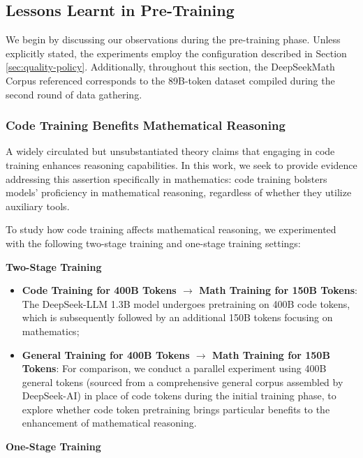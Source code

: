 \begin{itemize}[topsep=0pt]
\begin{itemize}[topsep=0pt]
\subsection{Lessons Learnt in Pre-Training}

We begin by discussing our observations during the pre-training phase. Unless explicitly stated, the experiments employ the configuration described in Section \ref{sec:quality-policy}. Additionally, throughout this section, the DeepSeekMath Corpus referenced corresponds to the 89B-token dataset compiled during the second round of data gathering.

\subsubsection{Code Training Benefits Mathematical Reasoning}

A widely circulated but unsubstantiated theory claims that engaging in code training enhances reasoning capabilities. In this work, we seek to provide evidence addressing this assertion specifically in mathematics: code training bolsters models’ proficiency in mathematical reasoning, regardless of whether they utilize auxiliary tools.

To study how code training affects mathematical reasoning, we experimented with the following two-stage training and one-stage training settings:

\textbf{Two-Stage Training}

\begin{itemize}[topsep=0pt]
    \item \textbf{Code Training for 400B Tokens $\rightarrow$ Math Training for 150B Tokens}: The DeepSeek-LLM 1.3B model undergoes pretraining on 400B code tokens, which is subsequently followed by an additional 150B tokens focusing on mathematics;
    \item \textbf{General Training for 400B Tokens $\rightarrow$ Math Training for 150B Tokens}: For comparison, we conduct a parallel experiment using 400B general tokens (sourced from a comprehensive general corpus assembled by DeepSeek-AI) in place of code tokens during the initial training phase, to explore whether code token pretraining brings particular benefits to the enhancement of mathematical reasoning.
\end{itemize}

\textbf{One-Stage Training}


\end{itemize}
\end{itemize}
